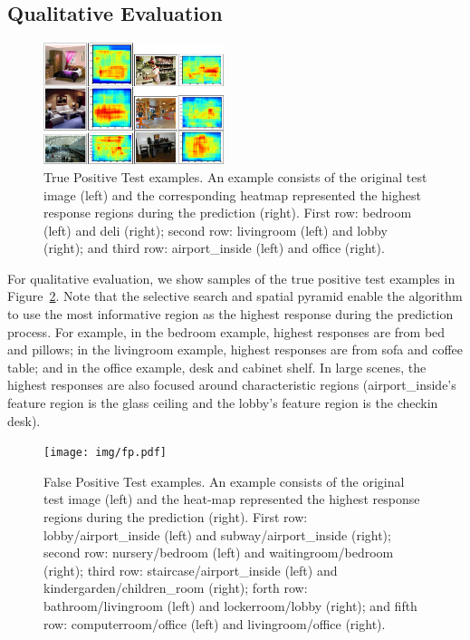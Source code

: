 \subsection{Qualitative Evaluation}
\begin{figure}[ht]
  \centering
  \includegraphics[width=0.47\textwidth]{img/tp.pdf}
  \centering
  \caption{True Positive Test examples. An example consists of the original test
image (left) and the corresponding heatmap represented the highest response
regions during the prediction (right). First row: bedroom (left) and deli
(right); second row: livingroom (left) and lobby (right); and third row:
airport\_inside (left) and office (right).}
  \label{fig:tp}
\end{figure}

For qualitative evaluation, we show samples of the true positive test examples
in Figure~\ref{fig:tp}. Note that the selective search and spatial pyramid
enable the algorithm to use the most informative region as the highest response
during the prediction process. For example, in the bedroom example, highest
responses are from bed and pillows; in the livingroom example, highest
responses are from sofa and coffee table; and in the office example, desk and
cabinet shelf. In large scenes, the highest responses are also focused around
characteristic regions (airport\_inside's feature region is the glass ceiling
and the lobby's feature region is the checkin desk).

\begin{figure}[ht]
  \centering
  \texttt{[image: img/fp.pdf]}
  \centering
  \caption{False Positive Test examples. An example consists of the original
test image (left) and the heat-map represented the highest response regions
during the prediction (right). First row: lobby/airport\_inside (left) and
subway/airport\_inside (right); second row: nursery/bedroom (left) and
waitingroom/bedroom (right); third row: staircase/airport\_inside (left) and
kindergarden/children\_room (right); forth row: bathroom/livingroom (left) and
lockerroom/lobby (right); and fifth row: computerroom/office (left) and
livingroom/office (right).}
  \label{fig:tp}
\end{figure}

